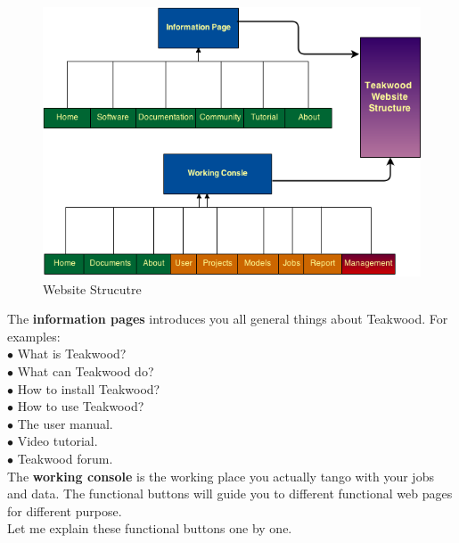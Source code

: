 \begin{figure}[htb]
\centering
\includegraphics[scale=0.6]{./website_structure} %
\caption{Website Strucutre}
\label{fig:label} %
\end{figure}

The \textbf{information pages} introduces you all general things about Teakwood. For examples:\\

$\bullet$ What is Teakwood?\\
$\bullet$ What can Teakwood do?\\
$\bullet$ How to install Teakwood?\\
$\bullet$ How to use Teakwood?\\
$\bullet$ The user manual.\\
$\bullet$ Video tutorial.\\
$\bullet$ Teakwood forum.\\


The \textbf{working console} is the working place you actually tango with your jobs and data. The functional buttons will guide you to different functional web pages for different purpose.\\
Let me explain these functional buttons one by one.\\

